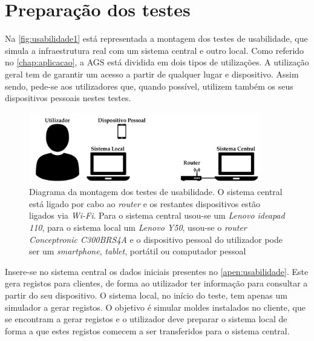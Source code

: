 \documentclass[11pt,twoside,a4paper]{report}
\begin{document}
\section{Preparação dos testes}
Na \autoref{fig:usabilidade1} está representada a montagem dos testes de usabilidade, que simula a infraestrutura real com um sistema central e outro local. Como referido no \autoref{chap:aplicacao}, a AGS está dividida em dois tipos de utilizações. A utilização geral tem de garantir um acesso a partir de qualquer lugar e dispositivo. Assim sendo, pede-se aos utilizadores que, quando possível, utilizem também os seus dispositivos pessoais nestes testes.
\begin{figure}[H]
	\vspace{0.5cm}
	\begin{center}
		\includegraphics[width=0.9\textwidth]{montagem_testes} %
		\caption[Diagrama da montagem dos testes de usabilidade]{Diagrama da montagem dos testes de usabilidade. O sistema central está ligado por cabo ao \textit{router} e os restantes dispositivos estão ligados via \textit{Wi-Fi}. Para o sistema central usou-se um \textit{Lenovo ideapad 110}, para o sistema local um \textit{Lenovo Y50}, usou-se o \textit{router} \textit{Conceptronic C300BRS4A} e o dispositivo pessoal do utilizador pode ser um \textit{smartphone}, \textit{tablet}, portátil ou computador pessoal}
		\label{fig:usabilidade1}
	\end{center}
\end{figure}
Insere-se no sistema central os dados iniciais presentes no \autoref{apen:usabilidade}. Este gera registos para clientes, de forma ao utilizador ter informação para consultar a partir do seu dispositivo. O sistema local, no início do teste, tem apenas um simulador a gerar registos. O objetivo é simular moldes instalados no cliente, que se encontram a gerar registos e o utilizador deve preparar o sistema local de forma a que estes registos comecem a ser transferidos para o sistema central.
\end{document}
